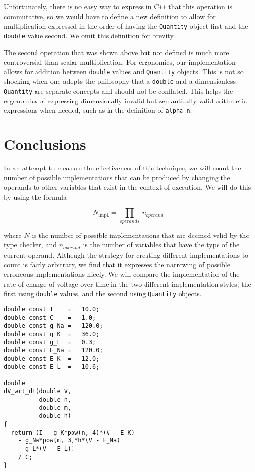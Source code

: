 \documentclass[reprint]{revtex4-1}
\begin{document}
Unfortunately, there is no easy way to express in C\verb!++! that this operation is commutative, so we would have to
define a new definition to allow for multiplication expressed in the order of having the \verb|Quantity|
object first and the \verb|double| value second. We omit this definition for brevity.

The second operation that was shown above but not defined is much more controversial than scalar multiplication.
For ergonomics, our implementation allows for addition between \verb|double| values and \verb|Quantity| objects.
This is not so shocking when one adopts the philosophy that a \verb|double| and a dimensionless \verb|Quantity|
are separate concepts and should not be conflated. This helps the ergonomics of expressing dimensionally invalid
but semantically valid arithmetic expressions when needed, such as in the definition of \verb|alpha_n|.

\section{Conclusions}
In an attempt to measure the effectiveness of this technique, we will count the number of possible
implementations that can be produced by changing the operands to other variables that exist in the
context of execution. We will do this by using the formula

\begin{equation*}
  N_{\text{impl.}} = \prod_{operands} \: n_{operand}
\end{equation*}

where $N$ is the number of possible implementations that are deemed valid by the type checker, and
$n_{operand}$ is the number of variables that have the type of the current operand. Although the strategy
for creating different implementations to count is fairly arbitrary, we find that it expresses the narrowing
of possible erroneous implementations nicely. We will compare
the implementation of the rate of change of voltage over time in the two different implementation styles;
the first using \verb|double| values, and the second using \verb|Quantity| objects.

\begin{verbatim}
double const I    =   10.0;
double const C    =   1.0;
double const g_Na =   120.0;
double const g_K  =   36.0;
double const g_L  =   0.3;
double const E_Na =   120.0; 
double const E_K  =  -12.0;
double const E_L  =   10.6;
    
double
dV_wrt_dt(double V,
          double n,
          double m,
          double h)
{
  return (I - g_K*pow(n, 4)*(V - E_K)
    - g_Na*pow(m, 3)*h*(V - E_Na)
    - g_L*(V - E_L))
    / C;
}
\end{verbatim}
\end{document}
